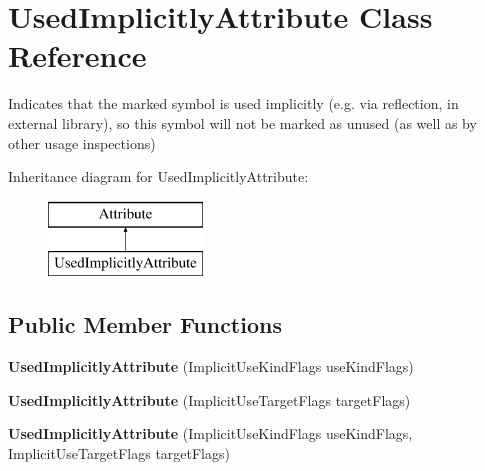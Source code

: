 \hypertarget{class_used_implicitly_attribute}{}\section{Used\+Implicitly\+Attribute Class Reference}
\label{class_used_implicitly_attribute}


Indicates that the marked symbol is used implicitly (e.\+g. via reflection, in external library), so this symbol will not be marked as unused (as well as by other usage inspections)  


Inheritance diagram for Used\+Implicitly\+Attribute\+:\begin{figure}[H]
\begin{center}
\leavevmode
\includegraphics[height=2.000000cm]{class_used_implicitly_attribute}
\end{center}
\end{figure}
\subsection*{Public Member Functions}
\begin{DoxyCompactItemize}
\item 
\hypertarget{class_used_implicitly_attribute_ae2dc37889a97f27f89c986e0e46ad81f}{}{\bfseries Used\+Implicitly\+Attribute} (Implicit\+Use\+Kind\+Flags use\+Kind\+Flags)\label{class_used_implicitly_attribute_ae2dc37889a97f27f89c986e0e46ad81f}

\item 
\hypertarget{class_used_implicitly_attribute_ae1b2c052663335aa4bf2e3ff2510e821}{}{\bfseries Used\+Implicitly\+Attribute} (Implicit\+Use\+Target\+Flags target\+Flags)\label{class_used_implicitly_attribute_ae1b2c052663335aa4bf2e3ff2510e821}

\item 
\hypertarget{class_used_implicitly_attribute_ad9247e3d6829ade0057de0bb0c7e3cbf}{}{\bfseries Used\+Implicitly\+Attribute} (Implicit\+Use\+Kind\+Flags use\+Kind\+Flags, Implicit\+Use\+Target\+Flags target\+Flags)\label{class_used_implicitly_attribute_ad9247e3d6829ade0057de0bb0c7e3cbf}

\end{DoxyCompactItemize}
